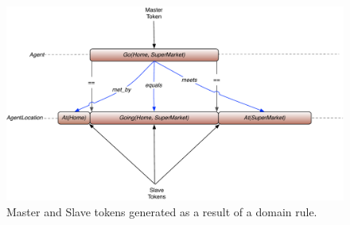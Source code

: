 \begin{description}
  \begin{figure}[t]
    \centering
    \includegraphics[scale=0.4]{figs/europa-pr-rules.pdf}
    \caption{\small Master and Slave tokens generated as a result of a domain rule.}
    \label{fig:europapr:rules}
  \end{figure}

\end{description}

